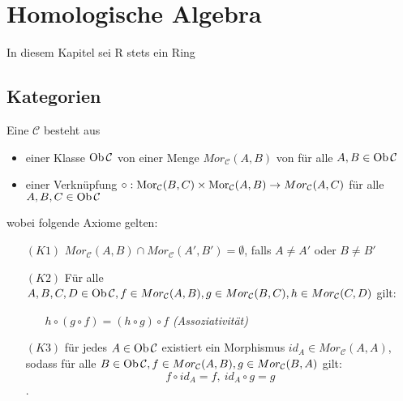 \newpage
\section{Homologische Algebra}
\begin{center}
	In diesem Kapitel sei R stets ein Ring
\end{center}
\setcounter{subsection}{3}
\subsection{Kategorien}
\begin{df}\label{2.4}
	Eine  $ \mathcal{C} $ besteht aus 
	\begin{itemize}
		\item einer Klasse $\text{Ob}\,\mathcal{C}$ von 
			einer Menge $Mor_{\mathcal{C}}(A,B) $ von  für alle $A,B \in \text{Ob}\,\mathcal{C}$
		\item einer Verknüpfung $\circ : \text{Mor}_{\mathcal{C}}(B,C) \times \text{Mor}_{\mathcal{C}}(A,B) \to Mor_{\mathcal{C}}(A,C) $ für alle $A,B,C \in \text{Ob}\,\mathcal{C}$
	\end{itemize}
	wobei folgende Axiome gelten:
	\begin{enumerate}
		\item[$(K1)$] $Mor_{\mathcal{C}}(A,B) \cap Mor_{\mathcal{C}}(A',B') = \emptyset$, falls $A \neq A'$ oder $B \neq B'$
		\item[$(K2)$] Für alle $A,B,C,D \in \text{Ob}\,\mathcal{C}, f \in Mor_{\mathcal{C}}(A,B), g \in Mor_{\mathcal{C}}(B,C), h \in Mor_{\mathcal{C}}(C,D)$ gilt:
		\begin{enumerate}
			\item[] $h \circ (g \circ f) = (h \circ g) \circ f$ \hfill \emph{(Assoziativität)}
		\end{enumerate}
		\item[$(K3)$] für jedes $ A \in \text{Ob}\,\mathcal{C}$ existiert ein Morphismus $id_A \in Mor_{\mathcal{C}}(A,A)$, sodass für alle $B \in \text{Ob}\,\mathcal{C}, f \in Mor_{\mathcal{C}}(A,B), g \in Mor_{\mathcal{C}}(B,A)$ gilt: $$f \circ id_A = f, \ id_A \circ g = g $$.
	\end{enumerate}
\end{df}
